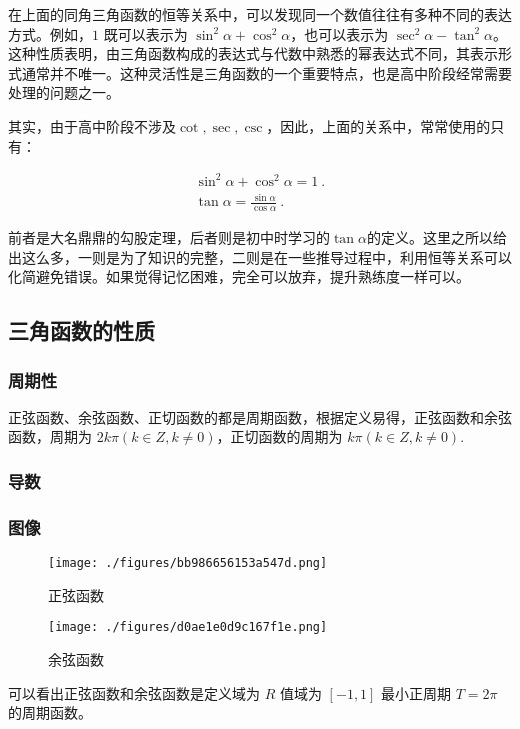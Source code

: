 在上面的同角三角函数的恒等关系中，可以发现同一个数值往往有多种不同的表达方式。例如，$1$ 既可以表示为 $\sin^2\alpha+\cos^2\alpha$，也可以表示为 $\sec^2\alpha-\tan^2\alpha$。这种性质表明，由三角函数构成的表达式与代数中熟悉的幂表达式不同，其表示形式通常并不唯一。这种灵活性是三角函数的一个重要特点，也是高中阶段经常需要处理的问题之一。

其实，由于高中阶段不涉及$\cot,\sec,\csc$，因此，上面的关系中，常常使用的只有：

\begin{gather}
\sin ^{2} \alpha + \cos ^{2}\alpha =1~.\\
\tan \alpha= \frac{\sin \alpha}{\cos \alpha}~.
\end{gather}

前者是大名鼎鼎的勾股定理，后者则是初中时学习的$\tan\alpha$的定义。这里之所以给出这么多，一则是为了知识的完整，二则是在一些推导过程中，利用恒等关系可以化简避免错误。如果觉得记忆困难，完全可以放弃，提升熟练度一样可以。



\subsection{三角函数的性质}

\subsubsection{周期性}
正弦函数、余弦函数、正切函数的都是周期函数，根据定义易得，正弦函数和余弦函数，周期为 $2k\pi(k\in Z,k\neq0)$，正切函数的周期为 $k\pi(k\in Z,k\neq0)$.
\subsubsection{导数}

\subsubsection{图像}

\begin{figure}[ht]
\centering
\texttt{[image: ./figures/bb986656153a547d.png]}
\caption{正弦函数} \label{fig_HsTrFu_1}
\end{figure}
\begin{figure}[ht]
\centering
\texttt{[image: ./figures/d0ae1e0d9c167f1e.png]}
\caption{余弦函数} \label{fig_HsTrFu_2}
\end{figure}
可以看出正弦函数和余弦函数是定义域为 $R$ 值域为 $[-1,1]$ 最小正周期 $T = 2\pi$ 的周期函数。
